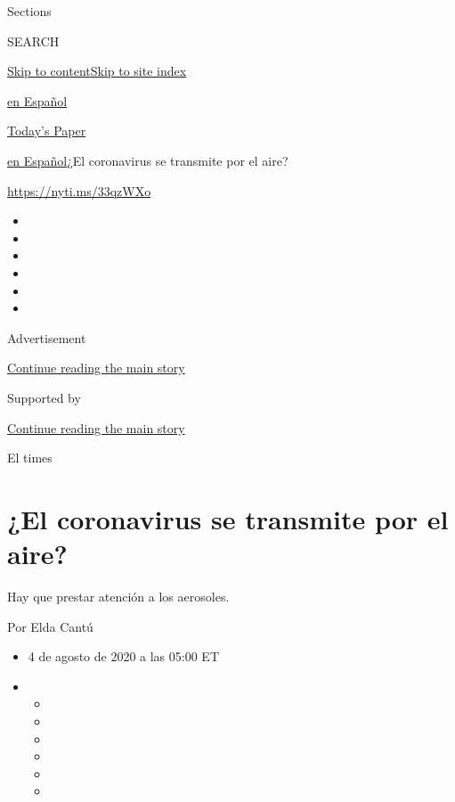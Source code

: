 Sections

SEARCH

\protect\hyperlink{site-content}{Skip to
content}\protect\hyperlink{site-index}{Skip to site index}

\href{https://www.nytimes.com/es/}{en Español}

\href{https://myaccount.nytimes.com/auth/login?response_type=cookie\&client_id=vi}{}

\href{https://www.nytimes.com/section/todayspaper}{Today's Paper}

\href{/es/}{en Español}\textbar{}¿El coronavirus se transmite por el
aire?

\url{https://nyti.ms/33qzWXo}

\begin{itemize}
\item
\item
\item
\item
\item
\item
\end{itemize}

Advertisement

\protect\hyperlink{after-top}{Continue reading the main story}

Supported by

\protect\hyperlink{after-sponsor}{Continue reading the main story}

El times

\hypertarget{el-coronavirus-se-transmite-por-el-aire}{%
\section{¿El coronavirus se transmite por el
aire?}\label{el-coronavirus-se-transmite-por-el-aire}}

Hay que prestar atención a los aerosoles.

Por Elda Cantú

\begin{itemize}
\item
  4 de agosto de 2020 a las 05:00 ET
\item
  \begin{itemize}
  \item
  \item
  \item
  \item
  \item
  \item
  \end{itemize}
\end{itemize}

